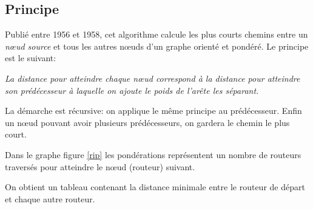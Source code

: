\documentclass[a4paper,11pt]{article}
\begin{document}
\subsection{Principe}
Publié entre 1956 et 1958, cet algorithme calcule les plus courts chemins entre un \emph{nœud source} et tous les autres nœuds d'un graphe orienté et pondéré. Le principe est le suivant:
\begin{center}
    \emph{La distance pour atteindre chaque nœud correspond à la distance pour atteindre son prédécesseur à laquelle on ajoute le poids de l'arête les séparant.}
\end{center}
La démarche est récursive: on applique le même principe au prédécesseur. Enfin un nœud pouvant avoir plusieurs prédécesseurs, on gardera le chemin le plus court.
\begin{center}
    \label{rip}
\end{center}
\begin{aretenir}[Remarque]
    Dans le graphe figure \ref{rip} les pondérations représentent un nombre de routeurs traversés pour atteindre le nœud (routeur) suivant.
\end{aretenir}
On obtient un tableau contenant la distance minimale entre le routeur de départ et chaque autre routeur.
\end{document}
